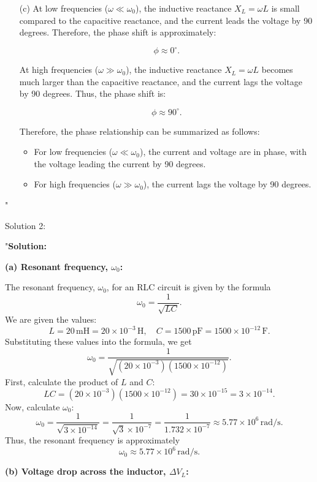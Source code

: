 \begin{enumerate}
    \item[(c)] At low frequencies ($\omega \ll \omega_0$), the inductive reactance $X_L = \omega L$ is small compared to the capacitive reactance, and the current leads the voltage by 90 degrees. Therefore, the phase shift is approximately:

    \[
    \phi \approx 0^\circ.
    \]

    At high frequencies ($\omega \gg \omega_0$), the inductive reactance $X_L = \omega L$ becomes much larger than the capacitive reactance, and the current lags the voltage by 90 degrees. Thus, the phase shift is:

    \[
    \phi \approx 90^\circ.
    \]

    Therefore, the phase relationship can be summarized as follows:

    \begin{itemize}
        \item For low frequencies ($\omega \ll \omega_0$), the current and voltage are in phase, with the voltage leading the current by 90 degrees.
        \item For high frequencies ($\omega \gg \omega_0$), the current lags the voltage by 90 degrees.
    \end{itemize}
\end{enumerate}"

Solution 2:

"\textbf{Solution:}

\textbf{(a) Resonant frequency, $\omega_0$:}

The resonant frequency, $\omega_0$, for an RLC circuit is given by the formula
\[
\omega_0 = \frac{1}{\sqrt{LC}}.
\]
We are given the values:
\[
L = 20\,\mathrm{mH} = 20 \times 10^{-3}\,\mathrm{H}, \quad C = 1500\,\mathrm{pF} = 1500 \times 10^{-12}\,\mathrm{F}.
\]
Substituting these values into the formula, we get
\[
\omega_0 = \frac{1}{\sqrt{(20 \times 10^{-3})(1500 \times 10^{-12})}}.
\]
First, calculate the product of $L$ and $C$:
\[
LC = (20 \times 10^{-3})(1500 \times 10^{-12}) = 30 \times 10^{-15} = 3 \times 10^{-14}.
\]
Now, calculate $\omega_0$:
\[
\omega_0 = \frac{1}{\sqrt{3 \times 10^{-14}}} = \frac{1}{\sqrt{3} \times 10^{-7}} = \frac{1}{1.732 \times 10^{-7}} \approx 5.77 \times 10^6\,\mathrm{rad/s}.
\]
Thus, the resonant frequency is approximately
\[
\omega_0 \approx 5.77 \times 10^6\,\mathrm{rad/s}.
\]

\textbf{(b) Voltage drop across the inductor, $\Delta V_L$:}

